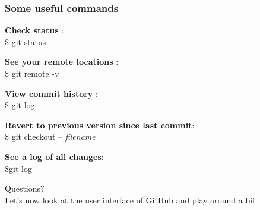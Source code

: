 \documentclass{beamer}\usepackage{graphicx, color}
\begin{document}
\begin{frame}
 \frametitle{Some useful commands}

\textbf{Check status} : \\ \$ git status \vspace{0.5cm}

\textbf{See your remote locations} : \\ \$ git remote -v \vspace{0.5cm}

\textbf{View commit history} : \\ \$ git log \vspace{0.5cm}

\textbf{Revert to previous version since last commit}:  \\ \$ git checkout -- \textit{filename}

\textbf{See a log of all changes}: \\ \$git log 

\end{frame}




\begin{frame}
\huge Questions?  \\
\vspace{1cm}
\pause
\normalsize Let's now look at the user interface of GitHub and play around a bit 
\end{frame}
\end{document}
